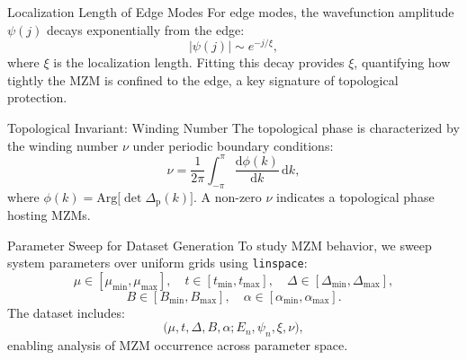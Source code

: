 \documentclass[aspectratio=169]{beamer}
\begin{document}
\begin{frame}{Localization Length of Edge Modes}
For edge modes, the wavefunction amplitude $\psi(j)$ decays exponentially from the edge:
\[ |\psi(j)| \sim e^{-j / \xi}, \]
where $\xi$ is the localization length. Fitting this decay provides $\xi$, quantifying how tightly the MZM is confined to the edge, a key signature of topological protection.
\end{frame}

\begin{frame}{Topological Invariant: Winding Number}
The topological phase is characterized by the winding number $\nu$ under periodic boundary conditions:
\[ \nu = \frac{1}{2\pi} \int_{-\pi}^{\pi} \frac{\mathrm{d}\phi(k)}{\mathrm{d}k} \,\mathrm{d}k, \]
where $\phi(k) = \mathrm{Arg}\bigl[\det \Delta_{\mathrm{p}}(k)\bigr]$. A non-zero $\nu$ indicates a topological phase hosting MZMs.
\end{frame}

\begin{frame}{Parameter Sweep for Dataset Generation}
To study MZM behavior, we sweep system parameters over uniform grids using \texttt{linspace}:
\[ \mu \in [\mu_{\min}, \mu_{\max}], \quad t \in [t_{\min}, t_{\max}], \quad \Delta \in [\Delta_{\min}, \Delta_{\max}], \]
\[ B \in [B_{\min}, B_{\max}], \quad \alpha \in [\alpha_{\min}, \alpha_{\max}]. \]
The dataset includes:
\[ \bigl(\mu, t, \Delta, B, \alpha; E_n, \psi_n, \xi, \nu\bigr), \]
enabling analysis of MZM occurrence across parameter space.
\end{frame}
\end{document}
